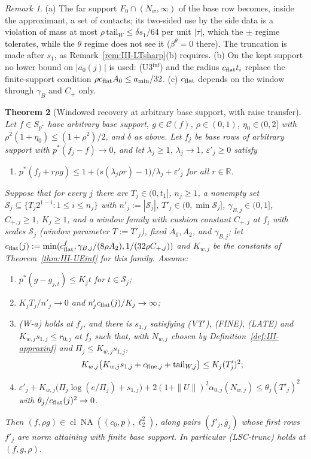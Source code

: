 \documentclass[10pt]{amsart}
\newtheorem{theorem}{Theorem}[section]
\theoremstyle{definition}
\theoremstyle{remark}
\newtheorem{remark}[theorem]{Remark}
\newcommand{\NA}{\operatorname{NA}}
\newcommand{\R}{\mathbb R}
\newcommand{\Cset}{\mathcal C}
\newcommand{\cl}{\operatorname{cl}}
\begin{document}
\begin{remark}\label{rem:III-UEinf}
(a) The far support $F_0\cap(N_w,\infty)$ of the base row becomes, inside the
approximant, a set of contacts; its two-sided use by the side data is a
violation of mass at most $\rho\,\mathrm{tail}_W\le\delta s_1/64$ per unit
$|\tau|$, which the $\pm$ regime tolerates, while the $\theta$ regime does not
see it ($\beta^\theta=0$ there).  The truncation is made after $s_1$, as
Remark~\ref{rem:III-LTsharp}(b) requires.  (b) On the kept support no lower
bound on $|a_0(j)|$ is used: (U3$^{\inf}$) and the radius $c_{\rm flat}t_i$
replace the finite-support condition $\rho c_{\rm flat}A_0\le a_{\min}/32$.
(c) $c_{\rm flat}$ depends on the window through $\gamma_B$ and $C_+$ only.
\end{remark}

\begin{theorem}[Windowed recovery at arbitrary base support, with raise transfer]
\label{thm:III-Eenginf}
Let $f\in S_{p^*}$ have arbitrary base support, $g\in\Cset(f)$, $\rho\in(0,1)$,
$\eta_0\in(0,2]$ with $\rho^2(1+\eta_0)\le(1+\rho^2)/2$, and $\delta$ as above.
Let $f_j$ be base rows of arbitrary support with $p^*(f_j-f)\to0$, and let
$\lambda_j\ge1$, $\lambda_j\to1$, $\varepsilon'_j\ge0$ satisfy
\begin{enumerate}
\item[(a)] $p^*(f_j+r\rho g)\le1+\big(s(\lambda_j\rho r)-1\big)/\lambda_j+
\varepsilon'_j$ for all $r\in\R$.
\end{enumerate}
Suppose that for every $j$ there are $T_j\in(0,t_1]$, $n_j\ge1$, a nonempty set
$\mathcal S_j\subseteq\{T_j2^{1-i}:1\le i\le n_j\}$ with $n'_j:=|\mathcal S_j|$,
$T'_j\in(0,\min\mathcal S_j]$, $\gamma_{B,j}\in(0,1]$, $C_{+,j}\ge1$, $K_j\ge1$,
and a window family with cushion constant $C_{+,j}$ at $f_j$ with scales
$\mathcal S_j$ (window parameter $T:=T'_j$), fixed $A_0,A_2$, and $\gamma_{B,j}$;
let $c_{\rm flat}(j):=\min(c^f_{\rm flat},\gamma_{B,j}/(8\rho A_2),
1/(32\rho C_{+,j}))$ and $K_{w,j}$ be the constants of
Theorem~\textup{\ref{thm:III-UEinf}} for this family.  Assume:
\begin{enumerate}
\item[(E-c)] $p^*(g-g_{j,t})\le K_jt$ for $t\in\mathcal S_j$;
\item[(E-d)] $K_jT_j/n'_j\to0$ and $n'_jc_{\rm flat}(j)/K_j\to\infty$;
\item[(E-f)] \textup{(W-a)} holds at $f_j$, and there is $s_{1,j}$ satisfying
\textup{(VT$'$)}, \textup{(FINE)}, \textup{(LATE)} and $K_{w,j}s_{1,j}\le r_{0,j}$
at $f_j$ such that, with $N_{w,j}$ chosen by
Definition~\textup{\ref{def:III-approxinf}} and $\Pi_j\le K_{w,j}s_{1,j}$,
\[
 K_{w,j}\big(K_{w,j}s_{1,j}+c_{{\rm fine},j}+\mathrm{tail}_{W,j}\big)\le
 K_j(T'_j)^2 ;
\]
\item[(E-e)] $\varepsilon'_j+K_{w,j}\big(\Pi_j\log(e/\Pi_j)+s_{1,j}\big)+
2(1+\|U\|)^2\alpha_{0,j}(N_{w,j})\le\theta_j(T'_j)^2$ with
$\theta_j/c_{\rm flat}(j)^2\to0$.
\end{enumerate}
Then $(f,\rho g)\in\cl\NA((c_0,p),\ell_2^2)$, along pairs $(f'_j,\bar g_j)$
whose first rows $f'_j$ are norm attaining with finite base support.  In
particular \textup{(LSC-trunc)} holds at $(f,g,\rho)$.
\end{theorem}
\end{document}
